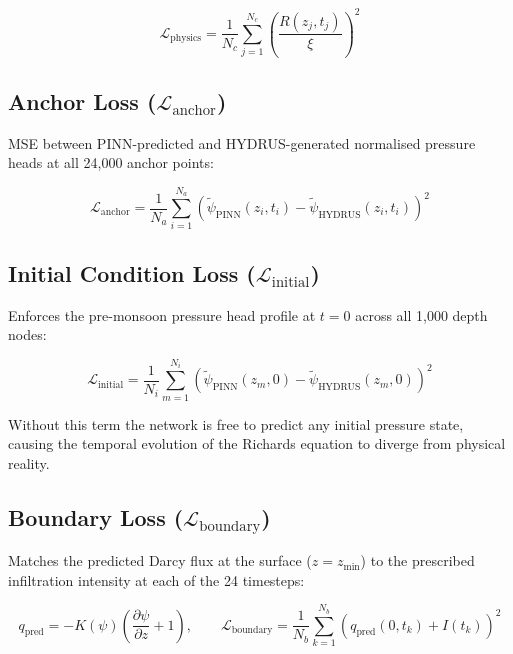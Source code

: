 \documentclass[12pt]{report}
\begin{document}
\begin{equation}
\mathcal{L}_{\text{physics}} = \frac{1}{N_c}
\sum_{j=1}^{N_c} \left(\frac{R(z_j, t_j)}{\xi}\right)^2
\end{equation}

\subsection{Anchor Loss ($\mathcal{L}_{\text{anchor}}$)}

MSE between PINN-predicted and HYDRUS-generated normalised pressure
heads at all 24,000 anchor points:

\begin{equation}
\mathcal{L}_{\text{anchor}} = \frac{1}{N_a}
\sum_{i=1}^{N_a}
\left(\tilde{\psi}_{\text{PINN}}(z_i, t_i) -
      \tilde{\psi}_{\text{HYDRUS}}(z_i, t_i)\right)^2
\end{equation}

\subsection{Initial Condition Loss ($\mathcal{L}_{\text{initial}}$)}

Enforces the pre-monsoon pressure head profile at $t = 0$ across all
1,000 depth nodes:

\begin{equation}
\mathcal{L}_{\text{initial}} = \frac{1}{N_i}
\sum_{m=1}^{N_i}
\left(\tilde{\psi}_{\text{PINN}}(z_m, 0) -
      \tilde{\psi}_{\text{HYDRUS}}(z_m, 0)\right)^2
\end{equation}

Without this term the network is free to predict any initial pressure
state, causing the temporal evolution of the Richards equation to
diverge from physical reality.

\subsection{Boundary Loss ($\mathcal{L}_{\text{boundary}}$)}

Matches the predicted Darcy flux at the surface ($z = z_{\min}$) to
the prescribed infiltration intensity at each of the 24 timesteps:

\begin{equation}
q_{\text{pred}} = -K(\psi)\left(\frac{\partial \psi}{\partial z}
+ 1\right), \qquad
\mathcal{L}_{\text{boundary}} = \frac{1}{N_b}
\sum_{k=1}^{N_b}
\left(q_{\text{pred}}(0, t_k) + I(t_k)\right)^2
\end{equation}
\end{document}
